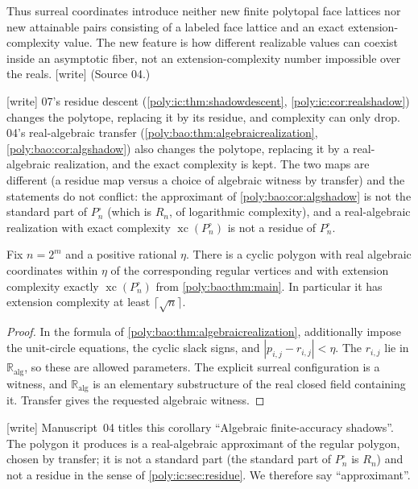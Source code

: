 \documentclass[11pt,a4paper]{article}
\numberwithin{equation}{section}
\theoremstyle{plain}
\newcommand{\wtag}{\textup{[write]}}%
\newcommand{\A}{\mathbb R_{\mathrm{alg}}}
\newcommand{\xc}{\operatorname{xc}}
\begin{document}
Thus surreal coordinates introduce neither new finite polytopal face
lattices nor new attainable pairs consisting of a labeled face lattice
and an exact extension-complexity value. The new feature is how different
realizable values can coexist inside an asymptotic fiber, not an
extension-complexity number impossible over the reals. \wtag{} (Source 04.)

\begin{remark}\label{poly:ic:rem:directions}
\wtag{} 07's residue descent (\cref{poly:ic:thm:shadowdescent},
\cref{poly:ic:cor:realshadow}) changes the polytope, replacing it by its
residue, and complexity can only drop. 04's real-algebraic transfer
(\cref{poly:bao:thm:algebraicrealization}, \cref{poly:bao:cor:algshadow})
also changes the polytope, replacing it by a real-algebraic realization,
and the exact complexity is kept. The two maps are different (a residue
map versus a choice of algebraic witness by transfer) and the statements
do not conflict: the approximant of \cref{poly:bao:cor:algshadow} is not
the standard part of $P^\circ_n$ (which is $R_n$, of logarithmic
complexity), and a real-algebraic realization with exact complexity
$\xc(P^\circ_n)$ is not a residue of $P^\circ_n$.
\end{remark}

\begin{corollary}\label{poly:bao:cor:algshadow}
Fix $n=2^m$ and a positive rational $\eta$. There is a cyclic polygon with
real algebraic coordinates within $\eta$ of the corresponding regular
vertices and with extension complexity exactly $\xc(P^\circ_n)$ from
\cref{poly:bao:thm:main}. In particular it has extension complexity at least
$\lceil\sqrt n\rceil$.
\end{corollary}
\begin{proof}
In the formula of \cref{poly:bao:thm:algebraicrealization}, additionally impose the
unit-circle equations, the cyclic slack signs, and
$|p_{i,j}-r_{i,j}|<\eta$. The $r_{i,j}$ lie in $\A$, so these are allowed
parameters. The explicit surreal configuration is a witness, and
$\A$ is an elementary substructure of the real closed field containing
it. Transfer gives the requested algebraic witness.
\end{proof}

\wtag{} Manuscript~04 titles this corollary ``Algebraic finite-accuracy
shadows''. The polygon it produces is a real-algebraic approximant of the
regular polygon, chosen by transfer; it is not a standard part (the
standard part of $P^\circ_n$ is $R_n$) and not a residue in the sense of
\cref{poly:ic:sec:residue}. We therefore say ``approximant''.
\end{document}
